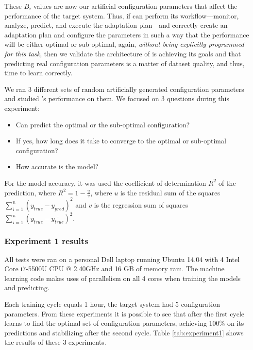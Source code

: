 These $B_i$ values are now our artificial configuration parameters that affect the performance of the target system. Thus, if \projectname{} can perform its workflow---monitor, analyze, predict, and execute the adaptation plan---and correctly create an adaptation plan and configure the parameters in such a way that the performance will be either optimal or sub-optimal, again, \emph{without being explicitly programmed for this task}, then we validate the architecture of \projectname{} is achieving its goals and that predicting real configuration parameters is a matter of dataset quality, and thus, time to learn correctly.

We ran 3 different sets of random artificially generated configuration parameters and studied \projectname{}'s performance on them. We focused on 3 questions during this experiment:

\begin{itemize}
  \item Can \projectname{} predict the optimal or the sub-optimal configuration?
  \item If yes, how long does it take to converge to the optimal or sub-optimal configuration?
  \item How accurate is the model?
\end{itemize}

For the model accuracy, it was used the coefficient of determination $R^2$ of the prediction, where $R^2 = 1 - \frac{u}{v}$, where $u$ is the residual sum of the squares  $\sum_{i=1}^{n}(y_{true} - y_{pred})^2$ and $v$ is the regression sum of squares $\sum_{i=1}^{n}(y_{true} - \overline{y_{true}})^2$.

\subsubsection{Experiment 1 results}

All tests were ran on a personal Dell laptop running Ubuntu 14.04 with 4 Intel Core i7-5500U CPU @ 2.40GHz and 16 GB of memory ram. The machine learning code makes uses of parallelism on all 4 cores when training the models and predicting.

Each training cycle equals 1 hour, the target system had 5 configuration parameters. From these experiments it is possible to see that after the first cycle \projectname{} learns to find the optimal set of configuration parameters, achieving 100\% on its predictions and stabilizing after the second cycle. Table \ref{tab:experiment1} shows the results of these 3 experiments.

